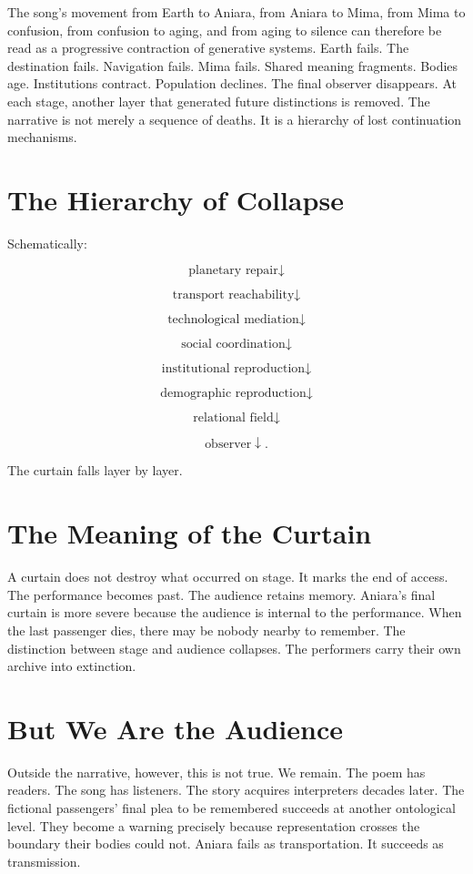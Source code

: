 \documentclass[11pt,oneside]{book}
\theoremstyle{definition}
\theoremstyle{remark}
\begin{document}
The song's movement from Earth to Aniara, from Aniara to Mima, from Mima to confusion, from
confusion to aging, and from aging to silence can therefore be read as a progressive contraction of
generative systems. Earth fails. The destination fails. Navigation fails. Mima fails. Shared meaning
fragments. Bodies age. Institutions contract. Population declines. The final observer disappears. At
each stage, another layer that generated future distinctions is removed. The narrative is not merely
a sequence of deaths. It is a hierarchy of lost continuation mechanisms.

\section{The Hierarchy of Collapse}

Schematically:

\[
\text{planetary repair} \downarrow
\]

\[
\text{transport reachability} \downarrow
\]

\[
\text{technological mediation} \downarrow
\]

\[
\text{social coordination} \downarrow
\]

\[
\text{institutional reproduction} \downarrow
\]

\[
\text{demographic reproduction} \downarrow
\]

\[
\text{relational field} \downarrow
\]

\[
\text{observer} \downarrow.
\]

The curtain falls layer by layer.

\section{The Meaning of the Curtain}

A curtain does not destroy what occurred on stage. It marks the end of access. The performance
becomes past. The audience retains memory. Aniara's final curtain is more severe because the
audience is internal to the performance. When the last passenger dies, there may be nobody nearby to
remember. The distinction between stage and audience collapses. The performers carry their own
archive into extinction.

\section{But We Are the Audience}

Outside the narrative, however, this is not true. We remain. The poem has readers. The song has
listeners. The story acquires interpreters decades later. The fictional passengers' final plea to be
remembered succeeds at another ontological level. They become a warning precisely because
representation crosses the boundary their bodies could not. Aniara fails as transportation. It
succeeds as transmission.
\end{document}

